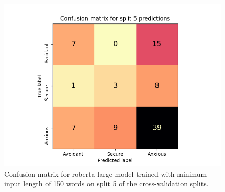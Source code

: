 \documentclass[12pt]{report}
\begin{document}
\begin{figure}
    \includegraphics[width=\textwidth]{figures/roberta-large_150_split5_confusion_matrix.png}
    \caption{Confusion matrix for roberta-large model trained with minimum input length of 150 words on split 5 of the cross-validation splits.}
    \label{fig: cm split5}
\end{figure}
    
\end{document}
